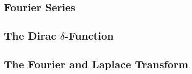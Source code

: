 \subsection{Fourier Series} %
\subsection{The Dirac $\delta$-Function}
\subsection{The Fourier and Laplace Transform}